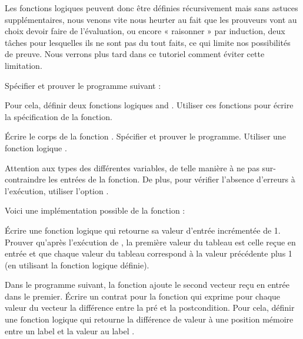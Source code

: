 Les fonctions logiques peuvent donc être définies récursivement mais sans astuces
supplémentaires, nous venons vite nous heurter au fait que les prouveurs vont au
choix devoir faire de l'évaluation, ou encore « raisonner » par induction, deux
tâches pour lesquelles ils ne sont pas du tout faits, ce qui limite nos
possibilités de preuve. Nous verrons plus tard dans ce tutoriel comment éviter
cette limitation.






Spécifier et prouver le programme suivant :




Pour cela, définir deux fonctions logiques  and .
Utiliser ces fonctions pour écrire la spécification de la fonction.




Écrire le corps de la fonction . Spécifier et prouver le
programme. Utiliser une fonction logique .




Attention aux types des différentes variables, de telle manière à ne pas
sur-contraindre les entrées de la fonction. De plus, pour vérifier l'absence
d'erreurs à l'exécution, utiliser l'option .




Voici une implémentation possible de la fonction  :




Écrire une fonction logique qui retourne sa valeur d'entrée incrémentée de 1.
Prouver qu'après l'exécution de , la première valeur du tableau
est celle reçue en entrée et que chaque valeur du tableau correspond à la valeur
précédente plus 1 (en utilisant la fonction logique définie).






Dans le programme suivant, la fonction  ajoute le second
vecteur reçu en entrée dans le premier. Écrire un contrat pour la fonction
 qui exprime pour chaque valeur du vecteur
 la différence entre la pré et la postcondition. Pour cela,
définir une fonction logique  qui retourne la différence de
valeur à une position mémoire entre un label  et la valeur au
label .



